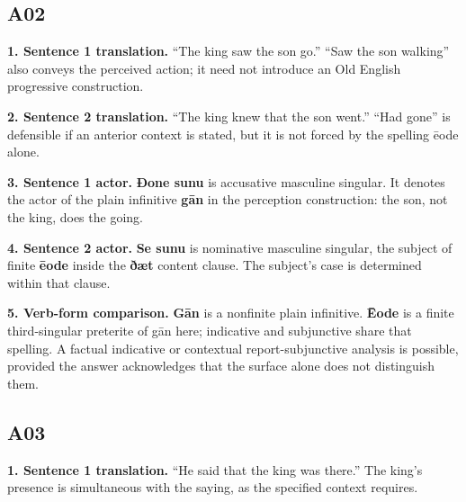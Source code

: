 \subsection*{A02}

\textbf{1. Sentence 1 translation.} “The king saw the son go.” “Saw the son walking” also conveys the perceived action; it need not introduce an Old English progressive construction.

\textbf{2. Sentence 2 translation.} “The king knew that the son went.” “Had gone” is defensible if an anterior context is stated, but it is not forced by the spelling ēode alone.

\textbf{3. Sentence 1 actor.} \textbf{Ðone sunu} is accusative masculine singular. It denotes the actor of the plain infinitive \textbf{gān} in the perception construction: the son, not the king, does the going.

\textbf{4. Sentence 2 actor.} \textbf{Se sunu} is nominative masculine singular, the subject of finite \textbf{ēode} inside the \textbf{ðæt} content clause. The subject’s case is determined within that clause.

\textbf{5. Verb-form comparison.} \textbf{Gān} is a nonfinite plain infinitive. \textbf{Ēode} is a finite third-singular preterite of gān here; indicative and subjunctive share that spelling. A factual indicative or contextual report-subjunctive analysis is possible, provided the answer acknowledges that the surface alone does not distinguish them.

\subsection*{A03}

\textbf{1. Sentence 1 translation.} “He said that the king was there.” The king’s presence is simultaneous with the saying, as the specified context requires.

